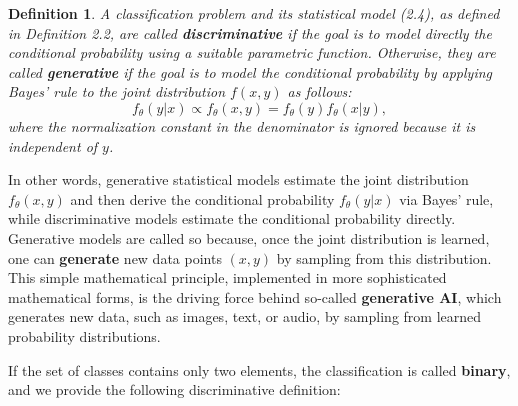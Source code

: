 \documentclass{report}
\newtheorem{definition}{Definition}[chapter]
\begin{document}
\begin{definition}
A classification problem and its statistical model (2.4), as defined in Definition 2.2, are called \textbf{discriminative} if the goal is to model directly the conditional probability using a suitable parametric function. Otherwise, they are called \textbf{generative} if the goal is to model the conditional probability by applying Bayes' rule to the joint distribution $f(x,y)$ as follows:
\begin{equation}
f_\theta(y|x) \propto f_\theta(x,y) = f_\theta(y)f_\theta(x|y),
\end{equation}
where the normalization
constant in the denominator is ignored because it is independent of $y$.
\end{definition}

In other words, generative statistical models estimate the joint distribution $f_\theta(x,y)$ and then derive the conditional probability $f_\theta(y|x)$ via Bayes' rule, while discriminative models estimate the conditional probability directly. Generative models are called so because, once the joint distribution is learned, one can \textbf{generate} new data points $(x,y)$ by sampling from this distribution. This simple mathematical principle, implemented in more sophisticated mathematical forms, is the driving force behind so-called \textbf{generative AI}, which generates new data, such as images, text, or audio, by sampling from learned probability distributions.

If the set of classes contains only two elements, the classification is called \textbf{binary}, and we provide the following discriminative definition:
\end{document}
